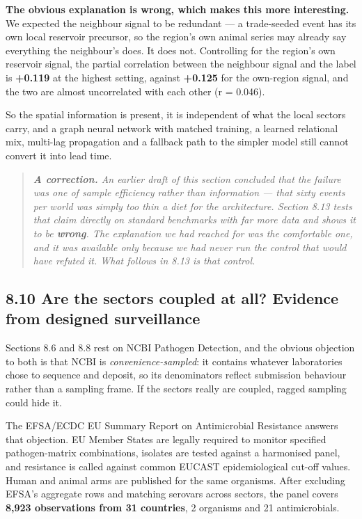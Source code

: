 \documentclass[11pt,a4paper]{article}
\begin{document}
\textbf{The obvious explanation is wrong, which makes this more interesting.} We expected the neighbour signal to be redundant — a trade-seeded event has its own local reservoir precursor, so the region's own animal series may already say everything the neighbour's does. It does not. Controlling for the region's own reservoir signal, the partial correlation between the neighbour signal and the label is \textbf{+0.119} at the highest setting, against \textbf{+0.125} for the own-region signal, and the two are almost uncorrelated with each other (r = 0.046).

So the spatial information is present, it is independent of what the local sectors carry, and a graph neural network with matched training, a learned relational mix, multi-lag propagation and a fallback path to the simpler model still cannot convert it into lead time.

\begin{quote}\emph{\textbf{A correction.} An earlier draft of this section concluded that the failure was one of \emph{sample efficiency} rather than information — that sixty events per world was simply too thin a diet for the architecture. Section 8.13 tests that claim directly on standard benchmarks with far more data and shows it to be \textbf{wrong}. The explanation we had reached for was the comfortable one, and it was available only because we had never run the control that would have refuted it. What follows in 8.13 is that control.}\end{quote}

\subsection*{8.10 Are the sectors coupled at all? Evidence from designed surveillance}

Sections 8.6 and 8.8 rest on NCBI Pathogen Detection, and the obvious objection to both is that NCBI is \emph{convenience-sampled}: it contains whatever laboratories chose to sequence and deposit, so its denominators reflect submission behaviour rather than a sampling frame. If the sectors really are coupled, ragged sampling could hide it.

The EFSA/ECDC EU Summary Report on Antimicrobial Resistance answers that objection. EU Member States are legally required to monitor specified pathogen-matrix combinations, isolates are tested against a harmonised panel, and resistance is called against common EUCAST epidemiological cut-off values. Human and animal arms are published for the same organisms. After excluding EFSA's aggregate rows and matching serovars across sectors, the panel covers \textbf{8,923 observations from 31 countries}, 2 organisms and 21 antimicrobials.
\end{document}
